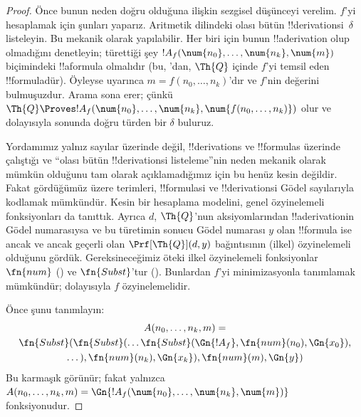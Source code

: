 \documentclass[../../../include/open-logic-section]{subfiles}
\begin{document}
\begin{proof}
Önce bunun neden doğru olduğuna ilişkin sezgisel düşünceyi verelim. $f$'yi
hesaplamak için şunları yaparız. Aritmetik dilindeki olası bütün
!!{derivation}s{}i~$\delta$ listeleyin. Bu mekanik olarak yapılabilir.
Her biri için bunun !!a{derivation} olup olmadığını denetleyin; türettiği
şey $!A_f(\num{n_0}, \dots, \num{n_k}, \num{m})$ biçimindeki
!!a{formula} olmalıdır (bu, 'dan, $\Th{Q}$ içinde $f$'yi
temsil eden !!{formula}{}dür). Öyleyse  uyarınca
$m=f(n_0,\dots,n_k)$'dır ve $f$'nin değerini bulmuşuzdur. Arama sona erer;
çünkü $\Th{Q} \Proves !A_f(\num{n_0}, \dots, \num{n_k},
\num{f(n_0, \dots, n_k)})$ olur ve dolayısıyla sonunda doğru türden bir
$\delta$ buluruz.

Yordamımız yalnız sayılar üzerinde değil, !!{derivation}s ve !!{formula}s
üzerinde çalıştığı ve ``olası bütün !!{derivation}s{}i listeleme''nin neden
mekanik olarak mümkün olduğunu tam olarak açıklamadığımız için bu henüz
kesin değildir. Fakat gördüğümüz üzere terimleri, !!{formula}s{}i ve
!!{derivation}s{}i Gödel sayılarıyla kodlamak mümkündür. Kesin bir hesaplama
modelini, genel özyinelemeli fonksiyonları da tanıttık. Ayrıca $d$,
$\Th{Q}$'nun aksiyomlarından !!a{derivation}{}in Gödel numarasıysa ve bu
türetimin sonucu Gödel numarası $y$ olan !!{formula} ise ancak ve ancak geçerli olan
$\Prf[\Th{Q}](d,y)$ bağıntısının (ilkel) özyinelemeli olduğunu gördük.
Gereksineceğimiz öteki ilkel özyinelemeli fonksiyonlar $\fn{num}$
() ve $\fn{Subst}$'tur
(). Bunlardan $f$'yi minimizasyonla
tanımlamak mümkündür; dolayısıyla $f$ özyinelemelidir.

Önce şunu tanımlayın:
\begin{multline*}
  A(n_0, \dots, n_k, m) = \\
  \fn{Subst}(\fn{Subst}(\dots\fn{Subst}(\Gn{!A_f}, \fn{num}(n_0), \Gn{x_0}),\\ \dots),
  \fn{num}(n_k),  \Gn{x_k}), \fn{num}(m), \Gn{y})
\end{multline*}
Bu karmaşık görünür; fakat yalnızca $A(n_0, \dots, n_k,
m) = \Gn{!A_f(\num{n_0}, \dots, \num{n_k}, \num{m})}$ fonksiyonudur.


\end{proof}
\end{document}
